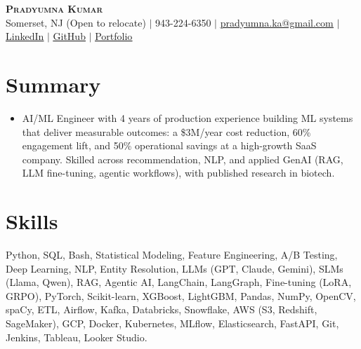 \documentclass[letterpaper,11pt]{article}
\newcommand{\resumeSubHeadingListStart}{\begin{itemize}[leftmargin=0.15in, label={}]}
\newcommand{\resumeSubHeadingListEnd}{\end{itemize}}
\begin{document}
\begin{center}
    \textbf{\huge \scshape Pradyumna Kumar} \\ \vspace{2pt}
     \small Somerset, NJ (Open to relocate) $|$ \small 943-224-6350 $|$ \href{mailto:pradyumna.ka@gmail.com}{\underline{pradyumna.ka@gmail.com}} $|$
    \href{https://linkedin.com/in/pradyum-kumar/}{\underline{LinkedIn}} $|$
    \href{https://github.com/prad101}{\underline{GitHub}} $|$
    \href{https://prad101.github.io/portfolio/}{\underline{Portfolio}}
\end{center}

\section{Summary}
{\footnotesize
  \resumeSubHeadingListStart
        \item{AI/ML Engineer with 4 years of production experience building ML systems that deliver measurable outcomes: a \$3M/year cost reduction, 60\% engagement lift, and 50\% operational savings at a high-growth SaaS company. Skilled across recommendation, NLP, and applied GenAI (RAG, LLM fine-tuning, agentic workflows), with published research in biotech.}
    \vspace{-5pt}
  \resumeSubHeadingListEnd
}
 \section{Skills}
 \begin{itemize}[leftmargin=0.15in, label={}]
    \footnotesize{\item{ Python, SQL, Bash, Statistical Modeling, Feature Engineering, A/B Testing, Deep Learning, NLP, Entity Resolution, LLMs (GPT, Claude, Gemini), SLMs (Llama, Qwen), RAG, Agentic AI, LangChain, LangGraph, Fine-tuning (LoRA, GRPO), PyTorch, Scikit-learn, XGBoost, LightGBM, Pandas, NumPy, OpenCV, spaCy, ETL, Airflow, Kafka, Databricks, Snowflake, AWS (S3, Redshift, SageMaker), GCP, Docker, Kubernetes, MLflow, Elasticsearch, FastAPI, Git, Jenkins, Tableau, Looker Studio.
    }}
    \vspace{-5pt}
 \end{itemize}
\end{document}
